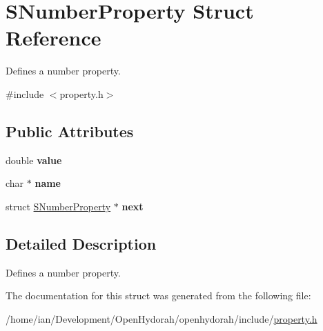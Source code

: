 \hypertarget{structSNumberProperty}{\section{S\-Number\-Property Struct Reference}
\label{structSNumberProperty}
}


Defines a number property.  




{\ttfamily \#include $<$property.\-h$>$}

\subsection*{Public Attributes}
\begin{DoxyCompactItemize}
\item 
\hypertarget{structSNumberProperty_a8875d9f3586e98f3d0a22256ea9e7696}{double {\bfseries value}}\label{structSNumberProperty_a8875d9f3586e98f3d0a22256ea9e7696}

\item 
\hypertarget{structSNumberProperty_a8f0f69fc4652296b9d19266abc1b7e7e}{char $\ast$ {\bfseries name}}\label{structSNumberProperty_a8f0f69fc4652296b9d19266abc1b7e7e}

\item 
\hypertarget{structSNumberProperty_a7fc329c4205aa7cd94732341dbf3f886}{struct \hyperlink{structSNumberProperty}{S\-Number\-Property} $\ast$ {\bfseries next}}\label{structSNumberProperty_a7fc329c4205aa7cd94732341dbf3f886}

\end{DoxyCompactItemize}


\subsection{Detailed Description}
Defines a number property. 

The documentation for this struct was generated from the following file\-:\begin{DoxyCompactItemize}
\item 
/home/ian/\-Development/\-Open\-Hydorah/openhydorah/include/\hyperlink{property_8h}{property.\-h}\end{DoxyCompactItemize}
